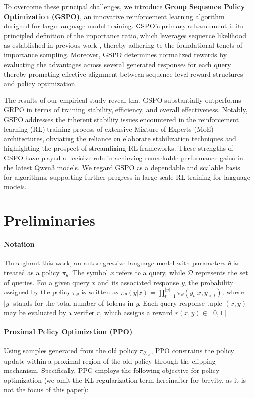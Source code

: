 To overcome these principal challenges, we introduce \textbf{Group Sequence Policy Optimization (GSPO)}, an innovative reinforcement learning algorithm designed for large language model training. GSPO's primary advancement is its principled definition of the importance ratio, which leverages sequence likelihood as established in previous work \citep{click}, thereby adhering to the foundational tenets of importance sampling. Moreover, GSPO determines normalized rewards by evaluating the advantages across several generated responses for each query, thereby promoting effective alignment between sequence-level reward structures and policy optimization.

The results of our empirical study reveal that GSPO substantially outperforms GRPO in terms of training stability, efficiency, and overall effectiveness. Notably, GSPO addresses the inherent stability issues encountered in the reinforcement learning (RL) training process of extensive Mixture-of-Experts (MoE) architectures, obviating the reliance on elaborate stabilization techniques and highlighting the prospect of streamlining RL frameworks. These strengths of GSPO have played a decisive role in achieving remarkable performance gains in the latest Qwen3 models. We regard GSPO as a dependable and scalable basis for algorithms, supporting further progress in large-scale RL training for language models.

\section{Preliminaries}

\paragraph{Notation}
Throughout this work, an autoregressive language model with parameters $\theta$ is treated as a policy $\pi_\theta$. The symbol $x$ refers to a query, while $\mathcal{D}$ represents the set of queries. For a given query $x$ and its associated response $y$, the probability assigned by the policy $\pi_\theta$ is written as $\pi_\theta (y | x)=\prod_{t=1}^{|y|} \pi_\theta (y_t | x, y_{<t} )$, where $|y|$ stands for the total number of tokens in $y$. Each query-response tuple $(x, y)$ may be evaluated by a verifier $r$, which assigns a reward $r(x, y) \in [ 0, 1 ]$.

\paragraph{Proximal Policy Optimization (PPO)} Using samples generated from the old policy $\pi_{\theta_\text{old}}$, PPO \citep{ppo} constrains the policy update within a proximal region of the old policy through the clipping mechanism. Specifically, PPO employs the following objective for policy optimization (we omit the KL regularization term hereinafter for brevity, as it is not the focus of this paper):

